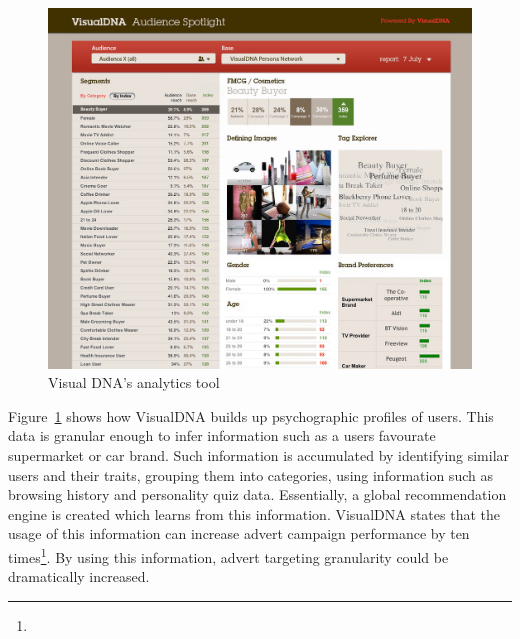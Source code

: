 	\begin{figure}[H]
		\centering
		\includegraphics[width=\textwidth]{images/visualdna.jpg}
		\caption[Caption for LOF]{Visual DNA's analytics tool\footnotemark}
		\label{fig:visualdna}
	\end{figure}

	Figure~\ref{fig:visualdna} shows how VisualDNA builds up psychographic profiles of users. This data is granular enough to infer information such as a users favourate supermarket or car brand. Such information is accumulated by identifying similar users and their traits, grouping them into categories, using information such as browsing history and personality quiz data. Essentially, a global recommendation engine is created which learns from this information. VisualDNA states that the usage of this information can increase advert campaign performance by ten times\footnote{}. By using this information, advert targeting granularity could be dramatically increased.

